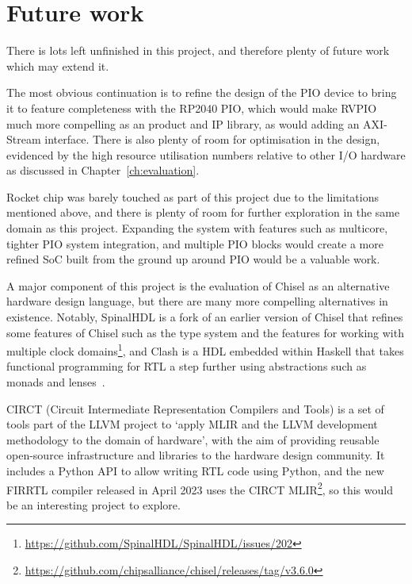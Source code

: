 \section{Future work}

There is lots left unfinished in this project, and therefore plenty of future work which may extend it.

The most obvious continuation is to refine the design of the PIO device to bring it to feature completeness with the RP2040 PIO, which would make RVPIO much more compelling as an product and IP library, as would adding an AXI-Stream interface. There is also plenty of room for optimisation in the design, evidenced by the high resource utilisation numbers relative to other I/O hardware as discussed in Chapter~\ref{ch:evaluation}.

Rocket chip was barely touched as part of this project due to the limitations mentioned above, and there is plenty of room for further exploration in the same domain as this project. Expanding the system with features such as multicore, tighter PIO system integration, and multiple PIO blocks would create a more refined SoC built from the ground up around PIO would be a valuable work.

A major component of this project is the evaluation of Chisel as an alternative hardware design language, but there are many more compelling alternatives in existence. Notably, SpinalHDL is a fork of an earlier version of Chisel that refines some features of Chisel such as the type system and the features for working with multiple clock domains\footnote{\url{https://github.com/SpinalHDL/SpinalHDL/issues/202}}, and Clash is a HDL embedded within Haskell that takes functional programming for RTL a step further using abstractions such as monads and lenses~\cite{clash}.

CIRCT (Circuit Intermediate Representation Compilers and Tools) is a set of tools part of the LLVM project to `apply MLIR and the LLVM development methodology to the domain of hardware', with the aim of providing reusable open-source infrastructure and libraries to the hardware design community. It includes a Python API to allow writing RTL code using Python, and the new FIRRTL compiler released in April 2023 uses the CIRCT MLIR\footnote{\url{https://github.com/chipsalliance/chisel/releases/tag/v3.6.0}}, so this would be an interesting project to explore.
